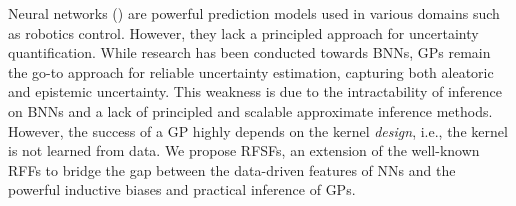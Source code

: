 Neural networks () are powerful prediction models used in various domains such as robotics control.
However, they lack a principled approach for uncertainty quantification.
While research has been conducted towards \acp{BNN}, \acp{GP} remain the go-to approach for reliable uncertainty estimation, capturing both aleatoric and epistemic uncertainty.
This weakness is due to the intractability of inference on \acp{BNN} and a lack of principled and scalable approximate inference methods.
However, the success of a \ac{GP} highly depends on the kernel \emph{design}, i.e., the kernel is not learned from data.
We propose \acp{RFSF}, an extension of the well-known \acp{RFF} to bridge the gap between the data-driven features of \acp{NN} and the powerful inductive biases and practical inference of \acp{GP}.
